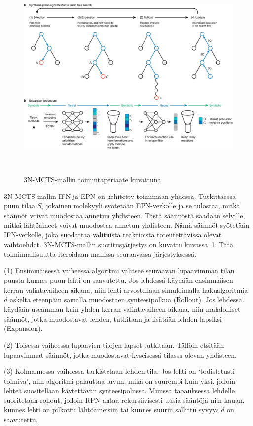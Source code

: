\documentclass[finnish,twoside,censored,tkt,sw-line]{HYthesisML}
\begin{document}
\begin{figure}[!ht]
    \centering
    \includegraphics[width=\textwidth]{3N-MCTS-fig.jpg}
    \caption{3N-MCTS-mallin toimintaperiaate kuvattuna}
    {~\cite{SeglerMarwinHS2018Pcsw}}
    \label{fig:3n-mcts-model}
\end{figure}

3N-MCTS-mallin IFN ja EPN on kehitetty toimimaan yhdessä.
Tutkittaessa puun tilaa \(S_i\) jokainen molekyyli syötetään EPN-verkolle ja se tulostaa, mitkä säännöt voivat muodostaa annetun yhdisteen.
Tästä säännöstä saadaan selville, mitkä lähtöaineet voivat muodostaa annetun yhdisteen.
Nämä säännöt syötetään IFN-verkolle, joka suodattaa valituista reaktioista toteutettavissa olevat vaihtoehdot.
3N-MCTS-mallin suoritusjärjestys on kuvattu kuvassa~\ref{fig:3n-mcts-model}.
Tätä toiminnallisuutta iteroidaan mallissa seuraavassa järjestyksessä.

(1) Ensimmäisessä vaiheessa algoritmi valitsee seuraavan lupaavimman tilan puusta kunnes puun lehti on saavutettu.
Jos lehdessä käydään ensimmäisen kerran valintavaiheen aikana, niin lehti arvostellaan simuloimalla hakualgoritmia \(d\) askelta eteenpäin samalla muodostaen synteesipolkua (Rollout).
Jos lehdessä käydään useamman kuin yhden kerran valintavaiheen aikana, niin mahdolliset säännöt, jotka muodostavat lehden, tutkitaan ja lisätään lehden lapsiksi (Expansion).

(2) Toisessa vaiheessa lupaavien tilojen lapset tutkitaan.
Tällöin etsitään lupaavimmat säännöt, jotka muodostavat kyseisessä tilassa olevan yhdisteen.

(3) Kolmannessa vaiheessa tarkistetaan lehden tila.
Jos lehti on `todistetusti toimiva', niin algoritmi palauttaa luvun, mikä on suurempi kuin yksi, jolloin lehteä suositellaan käytettävän synteesipolussa.
Muussa tapauksessa lehdelle suoritetaan rollout, jolloin RPN antaa rekursiivisesti uusia sääntöjä niin kauan, kunnes lehti on pilkottu lähtöaineisiin tai kunnes suurin sallittu syvyys \(d\) on saavutettu.
\end{document}

